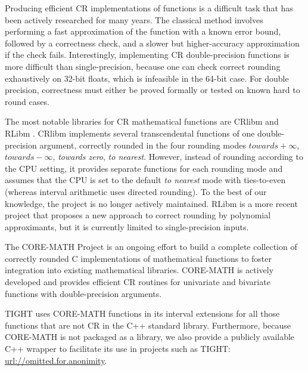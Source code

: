 Producing efficient CR implementations of functions is a difficult task that has been actively researched for many years.
The classical method involves performing a fast approximation of the function with a known error bound, followed by a correctness check, and a slower but higher-accuracy approximation if the check fails.
Interestingly, implementing CR double-precision functions is more difficult than single-precision, because one can check correct rounding exhaustively on 32-bit floats, which is infeasible in the 64-bit case.
For double precision, correctness must either be proved formally or tested on known hard to round cases.

The most notable libraries for CR mathematical functions are CRlibm \cite{crlibm} and RLibm \cite{rlibm}.
CRlibm implements several transcendental functions of one double-precision argument, correctly rounded in the four rounding modes $towards +\infty$, $towards -\infty$, \emph{towards zero}, \emph{to nearest}. However, instead of rounding according to the CPU setting, it provides separate functions for each rounding mode and  assumes that the CPU is set to the default \emph{to nearest} mode with ties-to-even (whereas interval arithmetic uses directed rounding).
To the best of our knowledge, the project is no longer actively maintained.
RLibm is a more recent project that proposes a new approach to correct rounding by polynomial approximants, but it is currently limited to single-precision inputs.

The CORE-MATH Project \cite{Sibidanov2022} is an ongoing effort to build a complete collection of correctly rounded C implementations of mathematical functions to foster integration into existing mathematical libraries. CORE-MATH is actively developed and provides efficient CR routines for univariate and bivariate functions with double-precision arguments.

TIGHT uses CORE-MATH functions in its interval extensions for all those functions that are not CR in the C++ standard library.
Furthermore, because CORE-MATH is not packaged as a library, we also provide a publicly available C++ wrapper to facilitate its use in projects such as TIGHT: \url{url://omitted.for.anonimity}.
